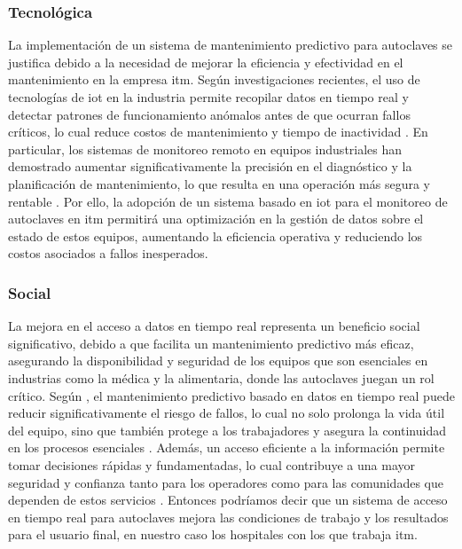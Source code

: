 \subsubsection*{Tecnológica}

La implementación de un sistema de mantenimiento predictivo para autoclaves se justifica debido a la necesidad de mejorar la eficiencia y efectividad en el mantenimiento en la empresa \acrshort{itm}. Según investigaciones recientes, el uso de tecnologías de \acrshort{iot} en la industria permite recopilar datos en tiempo real y detectar patrones de funcionamiento anómalos antes de que ocurran fallos críticos, lo cual reduce costos de mantenimiento y tiempo de inactividad \citep{J_tecnologica}. En particular, los sistemas de monitoreo remoto en equipos industriales han demostrado aumentar significativamente la precisión en el diagnóstico y la planificación de mantenimiento, lo que resulta en una operación más segura y rentable \citep{J_tecnologica2}. Por ello, la adopción de un sistema basado en \acrshort{iot} para el monitoreo de autoclaves en \acrshort{itm} permitirá una optimización en la gestión de datos sobre el estado de estos equipos, aumentando la eficiencia operativa y reduciendo los costos asociados a fallos inesperados.
\subsubsection*{Social}

La mejora en el acceso a datos en tiempo real representa un beneficio social significativo, debido a que facilita un mantenimiento predictivo más eficaz, asegurando la disponibilidad y seguridad de los equipos que son esenciales en industrias como la médica y la alimentaria, donde las autoclaves juegan un rol crítico. Según \cite{McKinsey2017}, el mantenimiento predictivo basado en datos en tiempo real puede reducir significativamente el riesgo de fallos, lo cual no solo prolonga la vida útil del equipo, sino que también protege a los trabajadores y asegura la continuidad en los procesos esenciales \citep{McKinsey2017}. Además, un acceso eficiente a la información permite tomar decisiones rápidas y fundamentadas, lo cual contribuye a una mayor seguridad y confianza tanto para los operadores como para las comunidades que dependen de estos servicios \citep{WEF2018}. Entonces podríamos decir que un sistema de acceso en tiempo real para autoclaves mejora las condiciones de trabajo y los resultados para el usuario final, en nuestro caso los hospitales con los que trabaja \acrshort{itm}.

